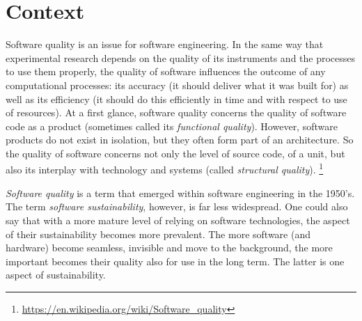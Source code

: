 \documentclass[a4paper,11pt]{article}
\begin{document}
\section{Context}

Software quality is an issue for software engineering. In the same way that
experimental research depends on the quality of its instruments and the
processes to use them properly, the quality of software influences the outcome
of any computational processes: its accuracy (it should deliver what it
was built for) as well as its efficiency (it should do this efficiently in
time and with respect to use of resources). At a first glance, software
quality concerns the quality of software code as a product (sometimes
called its \emph{functional quality}). However, software products do not exist in
isolation, but they often form part of an architecture. So the quality of software
concerns not only the level of source code, of a unit, but also its interplay
with technology and systems (called \emph{structural quality}).
\footnote{\url{https://en.wikipedia.org/wiki/Software\_quality}}

\textit{Software quality} is a term that emerged within software
engineering in the 1950's. The term \textit{software sustainability}, however, is far less widespread. One
could also say that with a more mature level of relying on software
technologies, the aspect of their sustainability becomes more prevalent. The
more software (and hardware) become seamless, invisible and move to the
background, the more important becomes their quality also for use in the long
term. The latter is one aspect of sustainability.
\end{document}
